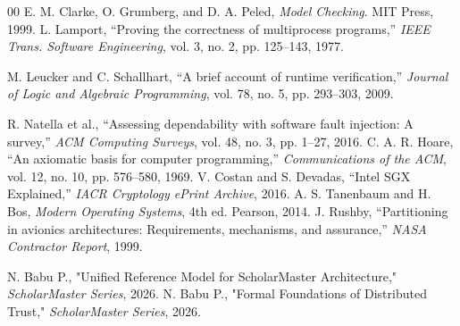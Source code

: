 \documentclass[conference]{IEEEtran}
\begin{document}
\begin{thebibliography}{00}
 E. M. Clarke, O. Grumberg, and D. A. Peled, \textit{Model Checking}. MIT Press, 1999.
 L. Lamport, ``Proving the correctness of multiprocess programs,'' \textit{IEEE Trans. Software Engineering}, vol. 3, no. 2, pp. 125--143, 1977.

 M. Leucker and C. Schallhart, ``A brief account of runtime verification,'' \textit{Journal of Logic and Algebraic Programming}, vol. 78, no. 5, pp. 293--303, 2009.

 R. Natella et al., ``Assessing dependability with software fault injection: A survey,'' \textit{ACM Computing Surveys}, vol. 48, no. 3, pp. 1--27, 2016.
 C. A. R. Hoare, ``An axiomatic basis for computer programming,'' \textit{Communications of the ACM}, vol. 12, no. 10, pp. 576--580, 1969.
 V. Costan and S. Devadas, ``Intel SGX Explained,'' \textit{IACR Cryptology ePrint Archive}, 2016.
 A. S. Tanenbaum and H. Bos, \textit{Modern Operating Systems}, 4th ed. Pearson, 2014.
 J. Rushby, ``Partitioning in avionics architectures: Requirements, mechanisms, and assurance,'' \textit{NASA Contractor Report}, 1999.


 N. Babu P., "Unified Reference Model for ScholarMaster Architecture," \textit{ScholarMaster Series}, 2026.
 N. Babu P., "Formal Foundations of Distributed Trust," \textit{ScholarMaster Series}, 2026.
\end{thebibliography}
\end{document}
